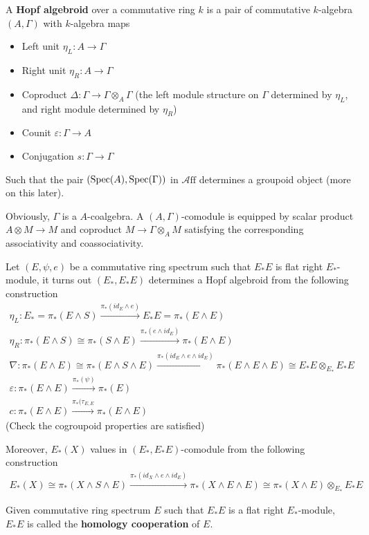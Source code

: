 \begin{definition}
    A \textbf{Hopf algebroid} over a commutative ring $k$ is a pair of commutative $k$-algebra $(A, \Gamma)$ with $k$-algebra maps
    \begin{itemize}
    \item Left unit $\eta_L: A\to \Gamma$
    \item Right unit $\eta_R: A\to \Gamma$
    \item Coproduct $\Delta: \Gamma\to \Gamma\otimes_A \Gamma$ (the left module structure on $\Gamma$ determined by $\eta_L$, and right module determined by $\eta_R$)
    \item Counit $\varepsilon: \Gamma\to A$
    \item Conjugation $s: \Gamma\to \Gamma$
    \end{itemize}
Such that the pair $(\operatorname{\mathrm{Spec}}(A), \operatorname{\mathrm{Spec}}(\Gamma))$ in $\mathcal{A}\mathrm{ff}$ determines a groupoid object (more on this later).
\end{definition} Obviously, $\Gamma$ is a $A$-coalgebra. A $(A, \Gamma)$-comodule is equipped by scalar product $A\otimes M\to M$ and coproduct $M\to \Gamma\otimes_{A}M$ satisfying the corresponding associativity and coassociativity.

Let $(E, \psi, e)$ be a commutative ring spectrum such that $E_*E$ is flat right $E_*$-module, it turns out $(E_*, E_*E)$ determines a Hopf algebroid from the following construction
\begin{align*}
    \eta_L:E_*=\pi_*(E\wedge S)\xrightarrow{\pi_*(id_E\wedge e)}E_*E=\pi_*(E\wedge E)
    \\ \eta_R:\pi_*(E\wedge S)\cong\pi_*(S\wedge E)\xrightarrow{\pi_*(e\wedge id_E)}\pi_*(E\wedge E)
    \\ \nabla: \pi_*(E\wedge E)\cong \pi_*(E\wedge S\wedge E)\xrightarrow{\pi_*(id_E\wedge e\wedge id_E)}\pi_*(E\wedge E\wedge E)\cong E_*E\otimes_{E_*}E_*E
    \\ \varepsilon:\pi_*(E\wedge E)\xrightarrow{\pi_*(\psi)}\pi_*(E)
    \\ c: \pi_*(E\wedge E)\xrightarrow{\pi_*(\tau_{E,E}}\pi_*(E\wedge E)
\end{align*}(Check the cogroupoid properties are satisfied)

Moreover, $E_*(X)$ values in $(E_*,E_*E)$-comodule from the following construction
\begin{align*}
    E_*(X)\cong \pi_*(X\wedge S\wedge E)\xrightarrow{\pi_*(id_X\wedge e\wedge id_E )}\pi_*(X\wedge E\wedge E)\cong \pi_*(X\wedge E)\otimes _{E_*}E_*E
\end{align*}

\begin{definition}
    Given commutative ring spectrum $E$ such that $E_*E$ is a flat right $E_*$-module, $E_*E$ is called the \textbf{homology cooperation} of $E$.
\end{definition}